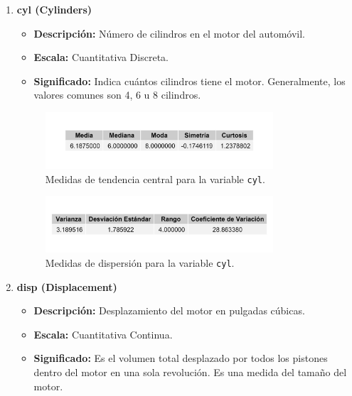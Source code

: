 \documentclass{article}
\begin{document}
\begin{enumerate}
    \item \textbf{cyl (Cylinders)}

          \begin{itemize}
              \item \textbf{Descripción:} Número de cilindros en el motor del automóvil.
              \item \textbf{Escala:} Cuantitativa Discreta.
              \item \textbf{Significado:} Indica cuántos cilindros tiene el motor. Generalmente, los valores comunes son 4, 6 u 8 cilindros.
          \end{itemize}

          \begin{figure}[H]
              \centering
              \includegraphics[width=0.8\textwidth]{MTC/cyl_central.png}
              \caption{Medidas de tendencia central para la variable \texttt{cyl}.}
              \label{fig:cyl_central}
          \end{figure}

          \begin{figure}[H]
              \centering
              \includegraphics[width=0.8\textwidth]{MTC/cyl_dispersion.png}
              \caption{Medidas de dispersión para la variable \texttt{cyl}.}
              \label{fig:cyl_dispersion}
          \end{figure}

    \item \textbf{disp (Displacement)}

          \begin{itemize}
              \item \textbf{Descripción:} Desplazamiento del motor en pulgadas cúbicas.
              \item \textbf{Escala:} Cuantitativa Continua.
              \item \textbf{Significado:} Es el volumen total desplazado por todos los pistones dentro del motor en una sola revolución. Es una medida del tamaño del motor.
          \end{itemize}


\end{enumerate}
\end{document}
